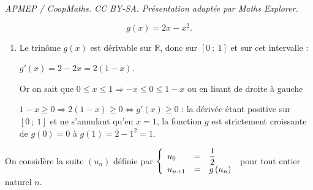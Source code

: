 \documentclass[10pt]{article}
\providecommand{\R}{\mathbb{R}}
\begin{document}
\noindent\textit{APMEP / CoopMaths. CC BY-SA. Présentation adaptée par Maths Explorer.}\par\medskip
\[g(x) = 2x - x^{2}.\]

\smallskip

\begin{enumerate}
\item 
Le trinôme $g(x)$ est dérivable sur $\R$, donc sur $[0~;~1]$ et sur cet intervalle :

$g'(x) = 2 - 2x = 2(1 - x)$.

Or on sait que $0\leqslant x \leqslant 1\Rightarrow - x \leqslant 0 \leqslant 1 - x$ ou en lisant de droite à gauche 

$1 - x \geqslant 0 \Rightarrow 2(1 - x) \geqslant 0 \iff g'(x) \geqslant 0$ : la dérivée étant positive sur $[0~;~1]$ et ne s'annulant qu'en $x = 1$, la fonction $g$ est strictement croissante de $g(0 ) = 0$ à $g(1) = 2 - 1^2 = 1$.
\end{enumerate}

On considère la suite $\left(u_{n}\right)$ définie par $\left\{\begin{array}{l c l}u_{0}&=&\dfrac{1}{2}\\ u_{n+1}&=&g\left(u_{n}\right)\end{array}\right.$ pour tout entier naturel $n$.
\end{document}
